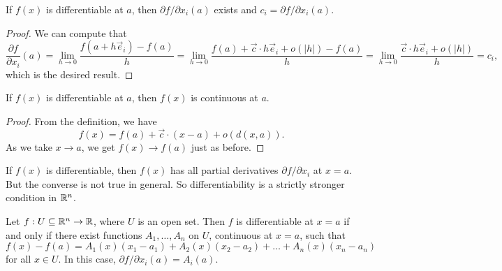 \begin{prop}
  If $f(x)$ is differentiable at $a$, then
  $\partial f / \partial x_i (a)$ exists and
  $c_i = \partial f / \partial x_i (a)$.
\end{prop}

\begin{proof}
  We can compute that
  \[
    \frac{\partial f}{\partial x_i}(a)
    = \lim_{h \to 0} \frac{f(a + h \vec{e}_i) - f(a)}{h}
    = \lim_{h \to 0} \frac{f(a) + \vec{c} \cdot h \vec{e}_i + o(|h|) - f(a)}{h}
    = \lim_{h \to 0} \frac{\vec{c} \cdot h \vec{e}_i + o(|h|)}{h}
    = c_i,
  \]
  which is the desired result.
\end{proof}

\begin{prop}
  If $f(x)$ is differentiable at $a$, then $f(x)$ is
  continuous at $a$.
\end{prop}

\begin{proof}
  From the definition, we have
  \[
    f(x) = f(a) + \vec{c} \cdot (x - a) + o(d(x, a)).
  \]
  As we take $x \to a$, we get $f(x) \to f(a)$ just
  as before.
\end{proof}

\begin{remark}
  If $f(x)$ is differentiable, then
  $f(x)$ has all partial derivatives $\partial f / \partial x_i$ at $x = a$.
  But the converse is not true in general. So
  differentiability is a strictly stronger condition
  in $\mathbb{R}^n$.
\end{remark}

\begin{lemma}
  Let $f : U \subseteq \mathbb{R}^n \to \mathbb{R}$, where $U$ is an open
  set. Then $f$ is differentiable at $x = a$ if and only
  if there exist functions $A_1, \dots, A_n$ on $U$,
  continuous at $x = a$, such that
  \[
    f(x) - f(a) = A_1(x)(x_1 - a_1) + A_2(x)(x_2 - a_2) + \dots + A_n(x)(x_n - a_n)
  \]
  for all $x \in U$. In this case,
  $\partial f / \partial x_i (a) = A_i(a)$.
\end{lemma}

